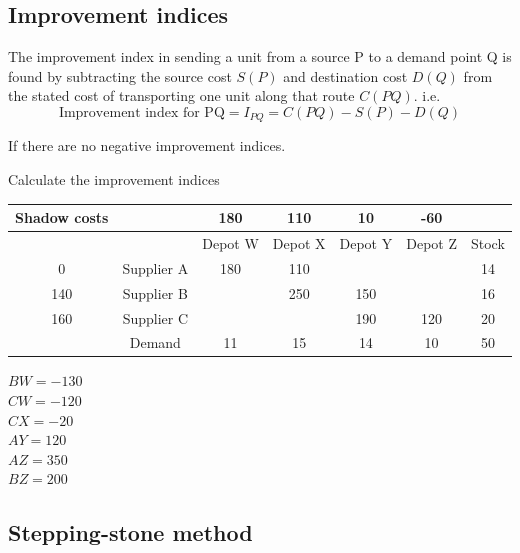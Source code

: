\documentclass[a4paper]{article}
\begin{document}
\subsection{Improvement indices}
\begin{defi}
	The improvement index in sending a unit from a source P to a demand point Q is found by subtracting the source cost $S(P)$ and destination cost $D(Q)$ from the stated cost of transporting one unit along that route $C(PQ)$. i.e.
	\[
		\text{Improvement index for PQ}=I_{PQ}=C(PQ)-S(P)-D(Q)
	\]
\end{defi}
\begin{defi}[Optimal]
	If there are no negative improvement indices.
\end{defi}
\begin{eg}
	Calculate the improvement indices
	\begin{center}
		\begin{tabular}{|c|c|c|c|c|c|c|}
			\hline
			Shadow costs &            & 180     & 110     & 10      & -60     &       \\
			\hline
			             &            & Depot W & Depot X & Depot Y & Depot Z & Stock \\
			\hline
			0            & Supplier A & 180     & 110     &         &         & 14    \\
			\hline
			140          & Supplier B &         & 250     & 150     &         & 16    \\
			\hline
			160          & Supplier C &         &         & 190     & 120     & 20    \\
			\hline
			             & Demand     & 11      & 15      & 14      & 10      & 50    \\
			\hline
		\end{tabular}
	\end{center}
	$BW=-130$\\
	$CW=-120$\\
	$ CX=-20$\\
	$ AY=120$\\
	$ AZ=350$\\
	$ BZ=200$\\
\end{eg}


\subsection{Stepping-stone method}
\end{document}

